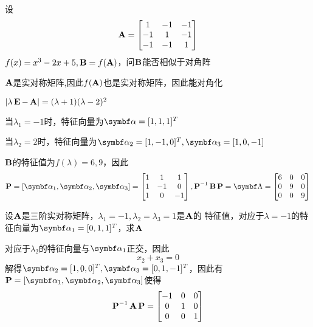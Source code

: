 \documentclass{article}
\begin{document}
\begin{examplle}[]
设
\begin{equation*}
\operatorname{\textbf{A}}=
\begin{bmatrix}
1&-1&-1\\-1&1&-1\\-1&-1&1
\end{bmatrix}
\end{equation*}
\(f(x)=x^3-2x+5,\operatorname{\textbf{B}}=f(\operatorname{\textbf{A}})\)，问\(\operatorname{\textbf{B}}\)能否相似于对角阵

\(\operatorname{\textbf{A}}\)是实对称矩阵,因此\(f(\operatorname{\textbf{A}})\)也是实对称矩阵，因此能对角化

\(\abs{\lambda\bE-\bA}=(\lambda+1)(\lambda-2)^2\)

当\(\lambda_1=-1\)时，特征向量为\(\balpha=[1,1,1]^T\)

当\(\lambda_2=2\)时，特征向量为\(\balpha_2=[1,-1,0]^T,\balpha_3=[1,0,-1]\)

\(\operatorname{\textbf{B}}\)的特征值为\(f(\lambda)=6,9\)，因此
\begin{equation*}
\bP=[\balpha_1,\balpha_2,\balpha_3]=
\begin{bmatrix}
1&1&1\\1&-1&0\\1&0&-1
\end{bmatrix},
\bP^{-1}\bB\bP=\bLambda=
\begin{bmatrix}
6&0&0\\0&9&0\\0&0&9
\end{bmatrix}
\end{equation*}
\end{examplle}

\begin{examplle}[]
设\(\operatorname{\textbf{A}}\)是三阶实对称矩阵，\(\lambda_1=-1,\lambda_2=\lambda_3=1\)是\(\operatorname{\textbf{A}}\)的
特征值，对应于\(\lambda=-1\)的特征向量为\(\balpha_1=[0,1,1]^T\)，求\(\operatorname{\textbf{A}}\)

对应于\(\lambda_2\)的特征向量与\(\balpha_1\)正交，因此
\begin{equation*}
x_2+x_3=0
\end{equation*}
解得\(\balpha_2=[1,0,0]^T,\balpha_3=[0,1,-1]^T\)，因此有
\(\bP=[\balpha_1,\balpha_2,\balpha_3]\)使得
\begin{equation*}
\operatorname{\textbf{P}}^{-1}\operatorname{\textbf{A}}\operatorname{\textbf{P}}=
\begin{bmatrix}
-1&0&0\\0&1&0\\0&0&1
\end{bmatrix}
\end{equation*}
\end{examplle}
\end{document}
